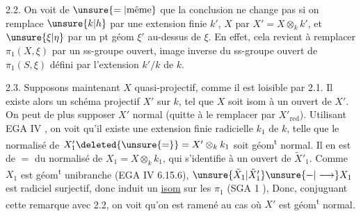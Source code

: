 
2.2. On voit de $\unsure{=|\text{même}}$ que la conclusion ne change pas  si on remplace $\unsure{k|h}$ par une extension finie $k'$, $X$ par $X'=X\otimes_k k'$, et $\unsure{\xi|\eta}$ par un pt géom $\xi'$ au-dessus de $\xi$. En effet, cela revient à  remplacer $\pi_1(X,\xi)$ par un ss-groupe ouvert, image inverse du ss-groupe ouvert de $\pi_1(S,\xi)$ défini par l'extension $k'/k$ de $k$.

2.3. Supposons maintenant $X$ quasi-projectif, comme il est loisible par 2.1. Il existe alors un schéma  projectif $X'$ sur $k$,  tel que $X$ soit isom à un ouvert   de $X'$. On peut de plus supposer $X'$ normal (quitte à le remplacer par  $X'_{\mathrm{red}}$).
Utilisant  EGA IV , on voit qu'il  existe une extension finie radicielle $k_1$ de $k$, telle que le normalisé  de $X'_1\deleted{\unsure{=} }=X'\otimes_k k_1$ soit géom\textsuperscript{t} normal.  Il en est de $=$ du normalisé  de $X_1=X\otimes_k k_1$, qui s'identifie à  un ouvert de $\tilde X'_1$. 
Comme $X_1$ est géom\textsuperscript{t} unibranche (EGA IV 6.15.6), $\unsure{\tilde X_1|\tilde X'_1}\unsure{-|\longrightarrow}X_1$ est radiciel surjectif, donc induit un \uline{isom} sur les $\pi_1$ (SGA 1  \unsure{\ldots}),  Donc, conjuguant cette remarque avec 2.2, on voit qu'on est ramené au cas où $X'$ est géom\textsuperscript{t} normal.
